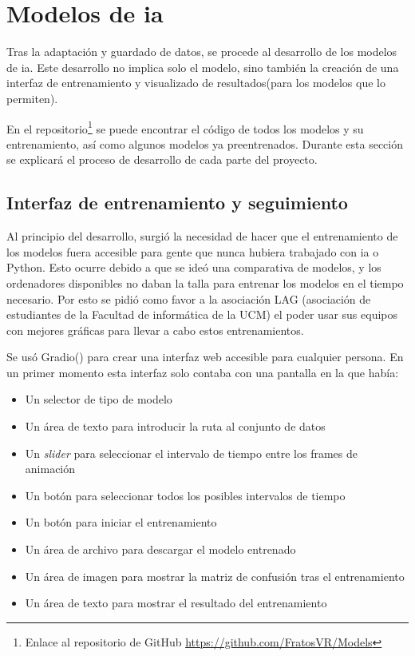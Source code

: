 \section{Modelos de \gls{ia}}

Tras la adaptación y guardado de datos, se procede al desarrollo de los modelos de \gls{ia}. Este desarrollo no implica solo el modelo, sino también la creación de una interfaz de entrenamiento y visualizado de resultados(para los modelos que lo permiten).

En el repositorio\footnote{Enlace al repositorio de GitHub \url{https://github.com/FratosVR/Models}} se puede encontrar el código de todos los modelos y su entrenamiento, así como algunos modelos ya preentrenados. Durante esta sección se explicará el proceso de desarrollo de cada parte del proyecto.

\subsection{Interfaz de entrenamiento y seguimiento}

Al principio del desarrollo, surgió la necesidad de hacer que el entrenamiento de los modelos fuera accesible para gente que nunca hubiera trabajado con \gls{ia} o Python. Esto ocurre debido a que se ideó una comparativa de modelos, y los ordenadores disponibles no daban la talla para entrenar los modelos en el tiempo necesario. Por esto se pidió como favor a la asociación LAG (asociación de estudiantes de la Facultad de informática de la UCM) el poder usar sus equipos con mejores gráficas para llevar a cabo estos entrenamientos.

Se usó Gradio(\cite{Abid_Gradio_Hassle-free_sharing_2019}) para crear una interfaz web accesible para cualquier persona. En un primer momento esta interfaz solo contaba con una pantalla en la que había:
\begin{itemize}
    \item Un selector de tipo de modelo
    \item Un área de texto para introducir la ruta al conjunto de datos
    \item Un \textit{slider} para seleccionar el intervalo de tiempo entre los frames de animación
    \item Un botón para seleccionar todos los posibles intervalos de tiempo
    \item Un botón para iniciar el entrenamiento
    \item Un área de archivo para descargar el modelo entrenado
    \item Un área de imagen para mostrar la matriz de confusión tras el entrenamiento
    \item Un área de texto para mostrar el resultado del entrenamiento
\end{itemize}

